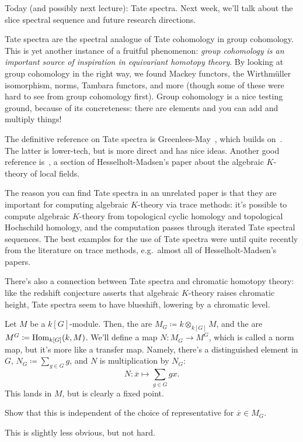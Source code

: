 Today (and possibly next lecture): Tate spectra. Next week, we'll talk about the slice spectral sequence and future
research directions.

Tate spectra are the spectral analogue of Tate cohomology in group cohomology. This is yet another instance of a
fruitful phenomenon: \emph{group cohomology is an important source of inspiration in equivariant homotopy theory}.
By looking at group cohomology in the right way, we found Mackey functors, the Wirthmüller isomorphism, norms,
Tambara functors, and more (though some of these were hard to see from group cohomology first). Group cohomology is
a nice testing ground, because of its concreteness: there are elements and you can add and multiply things!
\begin{rem}
The definitive reference on Tate spectra is Greenlees-May~\cite{GeneralizedTate}, which builds on~\cite{ACD}. The
latter is lower-tech, but is more direct and has nice ideas. Another good reference is~\cite[\S 4]{HM03}, a section
of Hesselholt-Madsen's paper about the algebraic $K$-theory of local fields.

The reason you can find Tate spectra in an  unrelated paper is that they are important for
computing algebraic $K$-theory via trace methods: it's possible to compute algebraic $K$-theory from topological
cyclic homology and topological Hochschild homology, and the computation passes through iterated Tate spectral
sequences. The best examples for the use of Tate spectra were until quite recently from the literature on trace
methods, e.g.\ almost all of Hesselholt-Madsen's papers.

There's also a connection between Tate spectra and chromatic homotopy theory: like the redshift conjecture asserts
that algebraic $K$-theory raises chromatic height, Tate spectra seem to have blueshift, lowering by a chromatic
level.
\end{rem}
Let $M$ be a $k[G]$-module. Then, the  are $M_G\coloneqq k\otimes_{k[G]} M$, and the
 are $M^G\coloneqq\operatorname{Hom}_{k[G]}(k, M)$. We'll define a map $N\colon M_G\to M^G$, which
is called a norm map, but it's more like a transfer map. Namely, there's a distinguished element in $G$,
$N_G\coloneqq \sum_{g\in G} g$, and $N$ is multiplication by $N_G$:
\[N\colon \overline x\mapsto\sum_{g\in G} gx.\]
This lands in $M$, but is clearly a fixed point.
\begin{ex}
Show that this is independent of the choice of representative for $\overline x\in M_G$.
\end{ex}
This is slightly less obvious, but not hard.

